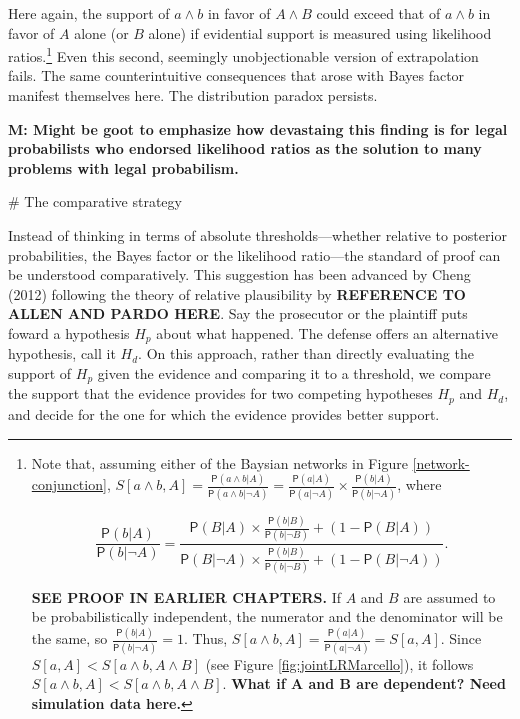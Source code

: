 \documentclass[10pt,dvipsnames,enabledeprecatedfontcommands]{scrartcl}
\newcommand{\pr}[1]{\mathsf{P}(#1)}
\begin{document}
\noindent Here again, the support of \(a\wedge b\) in favor of
\(A\wedge B\) could exceed that of \(a\wedge b\) in favor of \(A\) alone
(or \(B\) alone) if evidential support is measured using likelihood
ratios.\footnote{Note that, assuming either of the Baysian networks 
in Figure \ref{network-conjunction},  $S[a\wedge b, A]=\frac{\pr{a \wedge b \vert A}}{\pr{a\wedge b\vert \neg A}}=\frac{\pr{a \vert A}}{\pr{a \vert \neg A}}\times \frac{\pr{b \vert A}}{\pr{b \vert \neg A}}$, where

\[\frac{\pr{b \vert A}}{\pr{b \vert \neg A}} = \frac{\pr{B \vert A} \times \frac{\pr{b \vert B}}{\pr{b \vert \neg B}} + (1- \pr{B \vert A})}{\pr{B \vert \neg A} \times \frac{\pr{b \vert B}}{\pr{b \vert \neg B}} + (1- \pr{B \vert \neg A})}.\]

\textbf{SEE PROOF IN EARLIER CHAPTERS.}
 If $A$ and $B$ are assumed to be probabilistically independent, the numerator and the denominator will be the same, 
 so $\frac{\pr{b \vert A}}{\pr{b \vert \neg A}}=1$. Thus, 
 $S[a\wedge b, A]=\frac{\pr{a \vert A}}{\pr{a \vert \neg A}}=S[a, A]$. Since $S[a, A]< S[a\wedge b, A\wedge B]$ (see Figure \ref{fig:jointLRMarcello}), it follows $S[a\wedge b, A]<S[a\wedge b, A\wedge B]$. \textbf{What if A and B are dependent? Need simulation data here.}}
Even this second, seemingly unobjectionable version of extrapolation
fails. The same counterintuitive consequences that arose with Bayes
factor manifest themselves here. The distribution paradox persists.


\textbf{M: Might be goot to emphasize how devastaing this finding is for legal probabilists 
who endorsed likelihood ratios as the solution to many problems with legal probabilism.}

\# The comparative strategy

Instead of thinking in terms of absolute thresholds---whether relative
to posterior probabilities, the Bayes factor or the likelihood
ratio---the standard of proof can be understood comparatively. This
suggestion has been advanced by Cheng (2012) following the theory of
relative plausibility by \textbf{REFERENCE TO ALLEN AND PARDO HERE}. Say
the prosecutor or the plaintiff puts foward a hypothesis \(H_p\) about
what happened. The defense offers an alternative hypothesis, call it
\(H_d\). On this approach, rather than directly evaluating the support
of \(H_p\) given the evidence and comparing it to a threshold, we
compare the support that the evidence provides for two competing
hypotheses \(H_p\) and \(H_d\), and decide for the one for which the
evidence provides better support.
\end{document}
